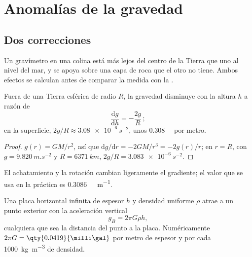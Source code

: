 \begin{omfigure}
\par{}
\label{fig:b1:isostasy-gravity:hypsometry}
\end{omfigure}

\section{Anomalías de la gravedad}

\subsection*{Dos correcciones}

Un gravímetro en una colina está más lejos del centro de la Tierra que uno al nivel del mar, y se apoya sobre una capa de roca que el
otro no tiene. Ambos efectos se calculan antes de comparar la medida con la .

\begin{proposition}\label{prop:b1:isostasy-gravity:free-air}
Fuera de una Tierra esférica de radio $R$, la gravedad disminuye con la altura $h$ a razón de
\[
  \frac{\mathrm dg}{\mathrm dh} = -\frac{2g}{R}\,;
\]
en la superficie, $2g/R \approx \qty{3.08e-6}{s^{-2}}$, unos
\qty{0.308}{\milli\gal} por metro.
\end{proposition}

\begin{proof}
$g(r) = GM/r^2$, así que $\mathrm dg/\mathrm dr = -2GM/r^3 = -2g(r)/r$; en $r = R$, con $g = \qty{9.820}{m.s^{-2}}$ y
$R = \qty{6371}{km}$, $2g/R =
\qty{3.083e-6}{s^{-2}}$.
\end{proof}

El achatamiento y la rotación cambian ligeramente el gradiente; el valor que se usa en la práctica es
\qty{0.3086}{\milli\gal.m^{-1}}.

\begin{proposition}\label{prop:b1:isostasy-gravity:slab}
Una placa horizontal infinita de espesor $h$ y densidad uniforme $\rho$ atrae a un punto exterior con la aceleración vertical
\[
  g_B = 2\pi G\rho h ,
\]
cualquiera que sea la distancia del punto a la placa. Numéricamente $2\pi G =
\qty{0.0419}{\milli\gal}$ por metro de espesor y por cada \qty{1000}{kg.m^{-3}} de densidad.
\end{proposition}

